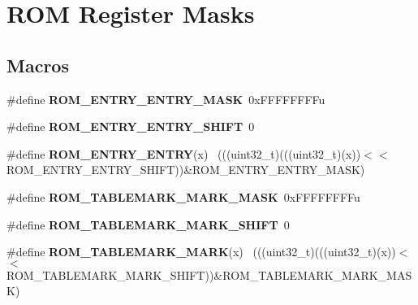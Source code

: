 \hypertarget{group___r_o_m___register___masks}{}\section{R\+O\+M Register Masks}
\label{group___r_o_m___register___masks}
\subsection*{Macros}
\begin{DoxyCompactItemize}
\item 
\hypertarget{group___r_o_m___register___masks_ga1857448185c74895d4ba462f8ebd76a9}{}\#define {\bfseries R\+O\+M\+\_\+\+E\+N\+T\+R\+Y\+\_\+\+E\+N\+T\+R\+Y\+\_\+\+M\+A\+S\+K}~0x\+F\+F\+F\+F\+F\+F\+F\+Fu\label{group___r_o_m___register___masks_ga1857448185c74895d4ba462f8ebd76a9}

\item 
\hypertarget{group___r_o_m___register___masks_gaef045dcd4648ca2c223f191d1e013673}{}\#define {\bfseries R\+O\+M\+\_\+\+E\+N\+T\+R\+Y\+\_\+\+E\+N\+T\+R\+Y\+\_\+\+S\+H\+I\+F\+T}~0\label{group___r_o_m___register___masks_gaef045dcd4648ca2c223f191d1e013673}

\item 
\hypertarget{group___r_o_m___register___masks_ga82d6b8222946f8fa04895a321c8668f5}{}\#define {\bfseries R\+O\+M\+\_\+\+E\+N\+T\+R\+Y\+\_\+\+E\+N\+T\+R\+Y}(x)                                          ~(((uint32\+\_\+t)(((uint32\+\_\+t)(x))$<$$<$R\+O\+M\+\_\+\+E\+N\+T\+R\+Y\+\_\+\+E\+N\+T\+R\+Y\+\_\+\+S\+H\+I\+F\+T))\&R\+O\+M\+\_\+\+E\+N\+T\+R\+Y\+\_\+\+E\+N\+T\+R\+Y\+\_\+\+M\+A\+S\+K)\label{group___r_o_m___register___masks_ga82d6b8222946f8fa04895a321c8668f5}

\item 
\hypertarget{group___r_o_m___register___masks_gaac600c2f3e33e425e374ca4f843d63e6}{}\#define {\bfseries R\+O\+M\+\_\+\+T\+A\+B\+L\+E\+M\+A\+R\+K\+\_\+\+M\+A\+R\+K\+\_\+\+M\+A\+S\+K}~0x\+F\+F\+F\+F\+F\+F\+F\+Fu\label{group___r_o_m___register___masks_gaac600c2f3e33e425e374ca4f843d63e6}

\item 
\hypertarget{group___r_o_m___register___masks_gaffb544cfa94716cfd71a99bb45c7411a}{}\#define {\bfseries R\+O\+M\+\_\+\+T\+A\+B\+L\+E\+M\+A\+R\+K\+\_\+\+M\+A\+R\+K\+\_\+\+S\+H\+I\+F\+T}~0\label{group___r_o_m___register___masks_gaffb544cfa94716cfd71a99bb45c7411a}

\item 
\hypertarget{group___r_o_m___register___masks_ga32c876a462e51b17340d7611cf9d9236}{}\#define {\bfseries R\+O\+M\+\_\+\+T\+A\+B\+L\+E\+M\+A\+R\+K\+\_\+\+M\+A\+R\+K}(x)                                    ~(((uint32\+\_\+t)(((uint32\+\_\+t)(x))$<$$<$R\+O\+M\+\_\+\+T\+A\+B\+L\+E\+M\+A\+R\+K\+\_\+\+M\+A\+R\+K\+\_\+\+S\+H\+I\+F\+T))\&R\+O\+M\+\_\+\+T\+A\+B\+L\+E\+M\+A\+R\+K\+\_\+\+M\+A\+R\+K\+\_\+\+M\+A\+S\+K)\label{group___r_o_m___register___masks_ga32c876a462e51b17340d7611cf9d9236}


\end{DoxyCompactItemize}
